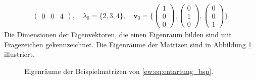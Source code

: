 \begin{align}
\begin{pmatrix}
        0 & 0 & 4
    \end{pmatrix},
    \quad
    \lambda_0 = \{2, 3, 4\},
    \quad
    \bm v_0 = \{
    \begin{pmatrix}
        1\\
        0\\
        0
    \end{pmatrix},
    \begin{pmatrix}
        0\\
        1\\
        0
    \end{pmatrix},
    \begin{pmatrix}
        0\\
        0\\
        1
    \end{pmatrix}
    \}.
\end{align} \label{ew:eq:entartung_bsp}
Die Dimensionen der Eigenvektoren, die einen Eigenraum bilden sind mit Fragezeichen gekennzeichnet.
Die Eigenräume der Matrizen sind in Abbildung \ref{ew:fig:entartung} illustriert.
\begin{figure}
    \begin{center}
        
    \end{center}
    \caption{Eigenräume der Beispielmatrizen von \ref{ew:eq:entartung_bsp}. }
    \label{ew:fig:entartung}
\end{figure}

